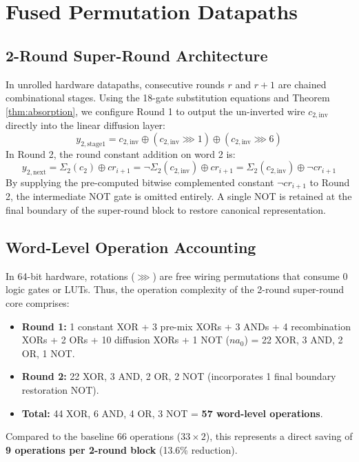 \documentclass[journal,10pt]{IEEEtran}
\begin{document}
\section{Fused Permutation Datapaths}

\subsection{2-Round Super-Round Architecture}
In unrolled hardware datapaths, consecutive rounds $r$ and $r+1$ are chained combinational stages. Using the 18-gate substitution equations and Theorem \ref{thm:absorption}, we configure Round 1 to output the un-inverted wire $c_{2,\text{inv}}$ directly into the linear diffusion layer:
\begin{equation}
y_{2,\text{stage1}} = c_{2,\text{inv}} \oplus (c_{2,\text{inv}} \ggg 1) \oplus (c_{2,\text{inv}} \ggg 6)
\end{equation}
In Round 2, the round constant addition on word 2 is:
\begin{equation}
y_{2,\text{next}} = \Sigma_2(c_2) \oplus cr_{i+1} = \neg \Sigma_2(c_{2,\text{inv}}) \oplus cr_{i+1} = \Sigma_2(c_{2,\text{inv}}) \oplus \neg cr_{i+1}
\end{equation}
By supplying the pre-computed bitwise complemented constant $\neg cr_{i+1}$ to Round 2, the intermediate NOT gate is omitted entirely. A single NOT is retained at the final boundary of the super-round block to restore canonical representation.

\subsection{Word-Level Operation Accounting}
In 64-bit hardware, rotations ($\ggg$) are free wiring permutations that consume 0 logic gates or LUTs. Thus, the operation complexity of the 2-round super-round core comprises:
\begin{itemize}
    \item \textbf{Round 1:} 1 constant XOR + 3 pre-mix XORs + 3 ANDs + 4 recombination XORs + 2 ORs + 10 diffusion XORs + 1 NOT ($na_0$) = 22 XOR, 3 AND, 2 OR, 1 NOT.
    \item \textbf{Round 2:} 22 XOR, 3 AND, 2 OR, 2 NOT (incorporates 1 final boundary restoration NOT).
    \item \textbf{Total:} 44 XOR, 6 AND, 4 OR, 3 NOT = \textbf{57 word-level operations}.
\end{itemize}
Compared to the baseline 66 operations ($33 \times 2$), this represents a direct saving of \textbf{9 operations per 2-round block} (13.6\% reduction).
\end{document}

